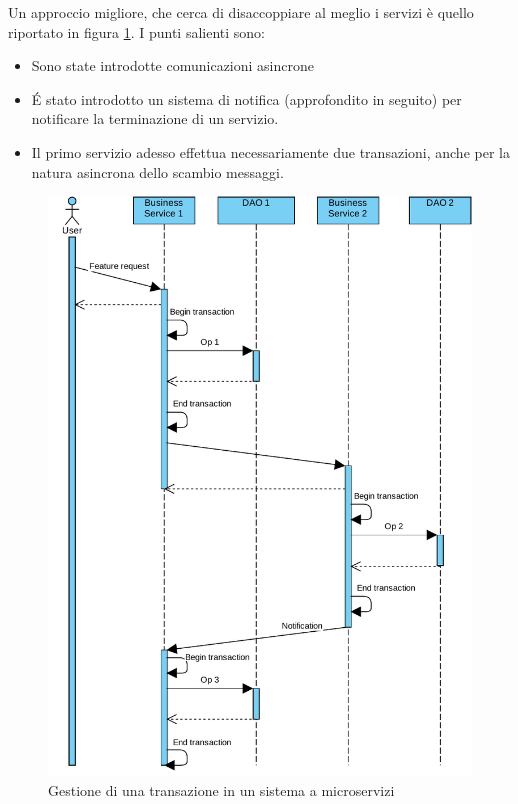 Un approccio migliore, che cerca di disaccoppiare al meglio i servizi è quello riportato in figura \ref{fig:micro-transaction}.
I punti salienti sono:
\begin{itemize}
	\item Sono state introdotte comunicazioni asincrone
	\item \'E stato introdotto un sistema di notifica (approfondito in seguito) per notificare la terminazione di un servizio.
	\item Il primo servizio adesso effettua necessariamente due transazioni, anche per la natura asincrona dello scambio messaggi.
\end{itemize}

\begin{figure}[h]
	\centering
	\includegraphics[width=\textwidth]{img/microservices-transaction}
	\caption{Gestione di una transazione in un sistema a microservizi}
	\label{fig:micro-transaction}
\end{figure}

